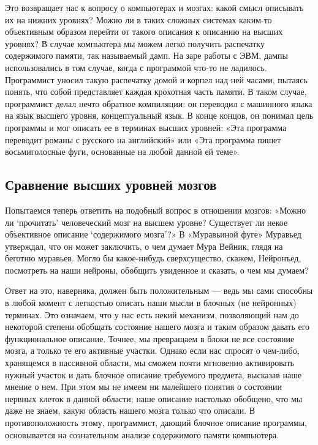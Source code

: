\documentclass[../main.tex]{subfiles}
\begin{document}
Это возвращает нас к вопросу о компьютерах и мозгах: какой смысл описывать их на нижних уровнях? Можно ли в таких сложных системах каким-то объективным образом перейти от такого описания к описанию на высших уровнях? В случае компьютера мы можем легко получить распечатку содержимого памяти, так называемый дамп. На заре работы с ЭВМ, дампы использовались в том случае, когда с программой что-то не ладилось. Программист уносил такую распечатку домой и корпел над ней часами, пытаясь понять, что собой представляет каждая крохотная часть памяти. В таком случае, программист делал нечто обратное компиляции: он переводил с машинного языка на язык высшего уровня, концептуальный язык. В конце концов, он понимал цель программы и мог описать ее в терминах высших уровней: «Эта программа переводит романы с русского на английский» или «Эта программа пишет восьмиголосные фуги, основанные на любой данной ей теме».


\subsection{Сравнение высших уровней мозгов}

Попытаемся теперь ответить на подобный вопрос в отношении мозгов: «Можно ли \enquote*{прочитать} человеческий мозг на высшем уровне? Существует ли некое объективное описание \enquote*{содержимого мозга}?» В «Муравьиной фуге» Муравьед утверждал, что он может заключить, о чем думает Мура Вейник, глядя на беготню муравьев. Могло бы какое-нибудь сверхсущество, скажем, Нейронъед, посмотреть на наши нейроны, обобщить увиденное и сказать, о чем мы думаем?

Ответ на это, наверняка, должен быть положительным --- ведь мы сами способны в любой момент с легкостью описать наши мысли в блочных (не нейронных) терминах. Это означаем, что у нас есть некий механизм, позволяющий нам до некоторой степени обобщать состояние нашего мозга и таким образом давать его функциональное описание. Точнее, мы превращаем в блоки не все состояние мозга, а только те его активные участки. Однако если нас спросят о чем-либо, хранящемся в пассивной области, мы сможем почти мгновенно активировать нужный участок и дать блочное описание требуемого предмета, высказав наше мнение о нем. При этом мы не имеем ни малейшего понятия о состоянии нервных клеток в данной области; наше описание настолько обобщено, что мы даже не знаем, какую область нашего мозга только что описали. В противоположность этому, программист, дающий блочное описание программы, основывается на сознательном анализе содержимого памяти компьютера.
\end{document}
